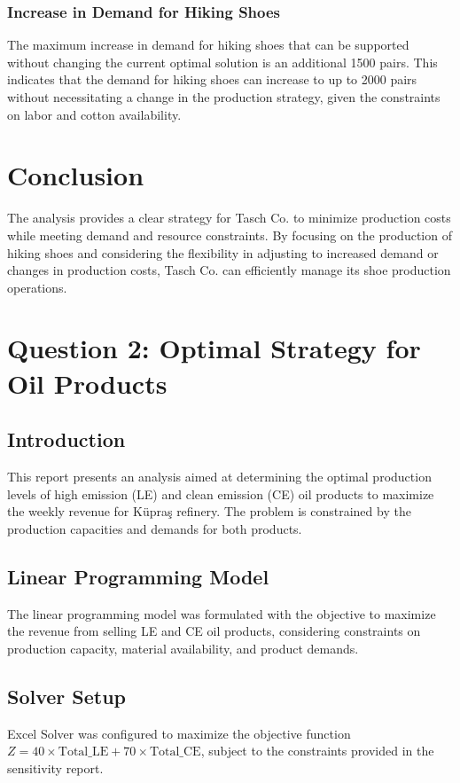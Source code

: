 \documentclass[12pt]{article}
\begin{document}
\subsubsection*{Increase in Demand for Hiking Shoes}

The maximum increase in demand for hiking shoes that can be supported without changing the current optimal solution is an additional 1500 pairs. This indicates that the demand for hiking shoes can increase to up to 2000 pairs without necessitating a change in the production strategy, given the constraints on labor and cotton availability.

\section*{Conclusion}

The analysis provides a clear strategy for Tasch Co. to minimize production costs while meeting demand and resource constraints. By focusing on the production of hiking shoes and considering the flexibility in adjusting to increased demand or changes in production costs, Tasch Co. can efficiently manage its shoe production operations.


\section*{Question 2: Optimal Strategy for Oil Products}

\subsection*{Introduction}
This report presents an analysis aimed at determining the optimal production levels of high emission (LE) and clean emission (CE) oil products to maximize the weekly revenue for Küpraş refinery. The problem is constrained by the production capacities and demands for both products.

\subsection*{Linear Programming Model}
The linear programming model was formulated with the objective to maximize the revenue from selling LE and CE oil products, considering constraints on production capacity, material availability, and product demands.

\subsection*{Solver Setup}
Excel Solver was configured to maximize the objective function $Z = 40 \times \text{Total\_LE} + 70 \times \text{Total\_CE}$, subject to the constraints provided in the sensitivity report.
\end{document}
